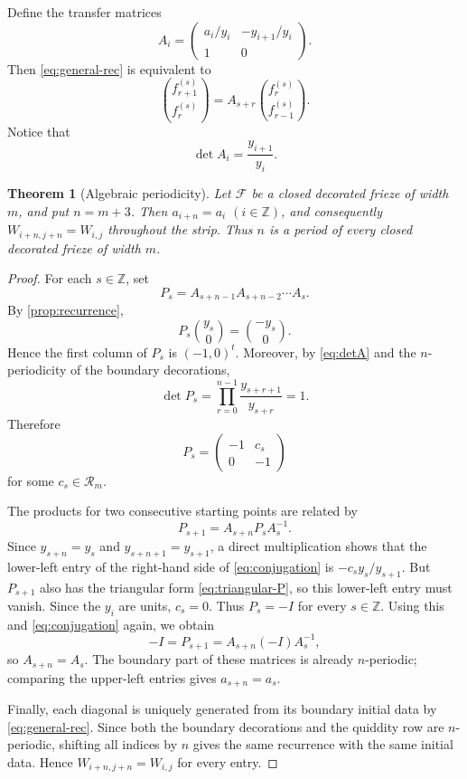 \documentclass[amstex,11pt,reqno]{amsart}
\newtheorem{theorem}{Theorem}[section]
\theoremstyle{definition}
\newcommand{\Z}{\mathbb Z}
\newcommand{\cF}{\mathcal F}
\newcommand{\cR}{\mathscr R}
\begin{document}
Define the transfer matrices
\begin{equation*}\label{eq:A}
 A_i=
 \begin{pmatrix}
 a_i/y_i&-y_{i+1}/y_i\\
 1&0
 \end{pmatrix}.
\end{equation*}
Then \eqref{eq:general-rec} is equivalent to
\begin{equation*}\label{eq:Arec}
 \binom{f^{(s)}_{r+1}}{f^{(s)}_r}
 =A_{s+r}
 \binom{f^{(s)}_r}{f^{(s)}_{r-1}}.
\end{equation*}
Notice that
\begin{equation}\label{eq:detA}
 \det A_i=\frac{y_{i+1}}{y_i}.
\end{equation}

\begin{theorem}[Algebraic periodicity]\label{thm:periodicity}
Let $\cF$ be a closed decorated frieze of width $m$, and put $n=m+3$. Then
$a_{i+n}=a_i$ $(i\in\Z)$,
and consequently
$W_{i+n,j+n}=W_{i,j}$
throughout the strip. Thus $n$ is a period of every closed decorated frieze of width $m$.
\end{theorem}

\begin{proof}
For each $s\in\Z$, set
\begin{equation*}\label{eq:Ps}
 P_s=A_{s+n-1}A_{s+n-2}\cdots A_s.
\end{equation*}
By \cref{prop:recurrence},
\[
 P_s\binom{y_s}{0}=\binom{-y_s}{0}.
\]
Hence the first column of $P_s$ is $(-1,0)^t$. Moreover, by \eqref{eq:detA} and the $n$-periodicity of the boundary decorations,
\[
 \det P_s
 =\prod_{r=0}^{n-1}\frac{y_{s+r+1}}{y_{s+r}}
 =1.
\]
Therefore
\begin{equation}\label{eq:triangular-P}
 P_s=
 \begin{pmatrix}-1&c_s\\0&-1\end{pmatrix}
\end{equation}
for some $c_s\in\cR_m$.

The products for two consecutive starting points are related by
\begin{equation}\label{eq:conjugation}
 P_{s+1}=A_{s+n}P_sA_s^{-1}.
\end{equation}
Since $y_{s+n}=y_s$ and $y_{s+n+1}=y_{s+1}$, a direct multiplication shows that the lower-left entry of the right-hand side of \eqref{eq:conjugation} is
$-c_s y_s/y_{s+1}$.
But $P_{s+1}$ also has the triangular form \eqref{eq:triangular-P}, so this lower-left entry must vanish. Since the $y_i$ are units, $c_s=0$. Thus
$P_s=-I$ for every $s\in\Z$.
Using this and \eqref{eq:conjugation} again, we obtain
\[
 -I=P_{s+1}=A_{s+n}(-I)A_s^{-1},
\]
so
$A_{s+n}=A_s$.
The boundary part of these matrices is already $n$-periodic; comparing the upper-left entries gives
$a_{s+n}=a_s$.

Finally, each diagonal is uniquely generated from its boundary initial data by \eqref{eq:general-rec}. Since both the boundary decorations and the quiddity row are $n$-periodic, shifting all indices by $n$ gives the same recurrence with the same initial data. Hence $W_{i+n,j+n}=W_{i,j}$ for every entry.
\end{proof}
\end{document}
